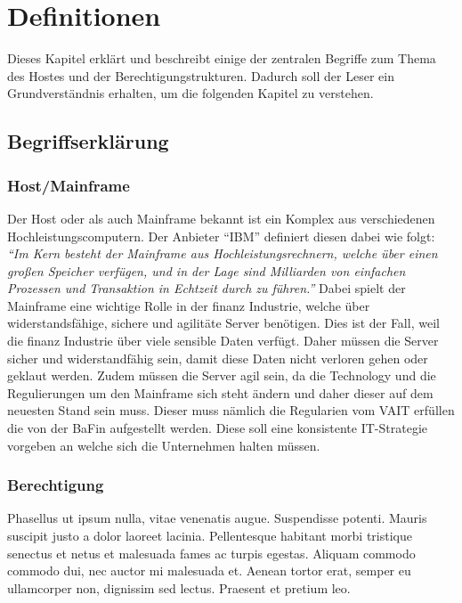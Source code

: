 \chapter{Definitionen}
\label{ch:chapter02}
Dieses Kapitel erklärt und beschreibt einige der zentralen Begriffe zum Thema des Hostes und der Berechtigungstrukturen.
Dadurch soll der Leser ein Grundverständnis erhalten, um die folgenden Kapitel zu verstehen.

%
%
\section{Begriffserklärung}
\label{sec:Bergriff}

\subsection{Host/Mainframe}
\label{sec:Host}
Der Host oder als auch Mainframe bekannt ist ein Komplex aus verschiedenen Hochleistungscomputern.
Der Anbieter "`IBM"' definiert diesen dabei wie folgt: 
\newline
\newline
\textit{"`Im Kern besteht der Mainframe aus Hochleistungsrechnern, welche über einen großen Speicher verfügen, und in der Lage sind Milliarden von einfachen Prozessen und Transaktion in Echtzeit durch zu führen."'} \cite{Mainframe}
\newline
\newline
Dabei spielt der Mainframe eine wichtige Rolle in der finanz Industrie, welche über widerstandsfähige, sichere und agilitäte Server benötigen.
Dies ist der Fall, weil die finanz Industrie über viele sensible Daten verfügt.
Daher müssen die Server sicher und widerstandfähig sein, damit diese Daten nicht verloren gehen oder geklaut werden.
Zudem müssen die Server agil sein, da die Technology und die Regulierungen um den Mainframe sich steht ändern und daher dieser auf dem neuesten Stand sein muss.
Dieser muss nämlich die Regularien vom \ac{VAIT} erfüllen die von der \ac{BaFin} aufgestellt werden.
Diese soll eine konsistente IT-Strategie vorgeben an welche sich die Unternehmen halten müssen. \cite{Vait}

\subsection{Berechtigung}
\label{sec:Berechtigung}
Phasellus ut ipsum nulla, vitae venenatis augue. Suspendisse potenti. Mauris suscipit justo a dolor laoreet lacinia. Pellentesque habitant morbi tristique senectus et netus et malesuada fames ac turpis egestas. Aliquam commodo commodo dui, nec auctor mi malesuada et. Aenean tortor erat, semper eu ullamcorper non, dignissim sed lectus. Praesent et pretium leo.

